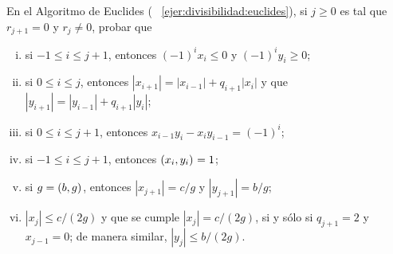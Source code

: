 \begin{ejerDivisibilidad}
	En el Algoritmo de Euclides (\ejername~%
	\ref{ejer:divisibilidad:euclides}), si $j\geq 0$ es tal que
	$r_{j+1}=0$ y $r_j\neq 0$, probar que
	\begin{enumerate}[(i)]
		\item\label{ejer:euclides:propiedades:i}
			si $-1\leq i\leq j+1$, entonces
			$(-1)^ix_i\leq 0$ y $(-1)^iy_i\geq 0$;
		\item\label{ejer:euclides:propiedades:ii}
			si $0\leq i\leq j$, entonces
			$|x_{i+1}|=|x_{i-1}|+q_{i+1}|x_i|$ y que
			$|y_{i+1}|=|y_{i-1}|+q_{i+1}|y_i|$;
		\item\label{ejer:euclides:propiedades:iii}
			si $0\leq i\leq j+1$, entonces
			$x_{i-1}y_i-x_iy_{i-1}=(-1)^i$;
		\item\label{ejer:euclides:propiedades:iv}
			si $-1\leq i\leq j+1$, entonces
			$\left({x_i,y_i}\right)_{}=1$;
		\item\label{ejer:euclides:propiedades:v}
			si $g=\left({b,g}\right)_{}$, entonces
			$|x_{j+1}|=c/g$ y $|y_{j+1}|=b/g$;
		\item\label{ejer:euclides:propiedades:vi}
			$|x_j|\leq c/(2g)$ y que se cumple
			$|x_j|=c/(2g)$, si y s\'olo si $q_{j+1}=2$ y
			$x_{j-1}=0$; de manera similar,
			$|y_j|\leq b/(2g)$.
	\end{enumerate}
\end{ejerDivisibilidad}
